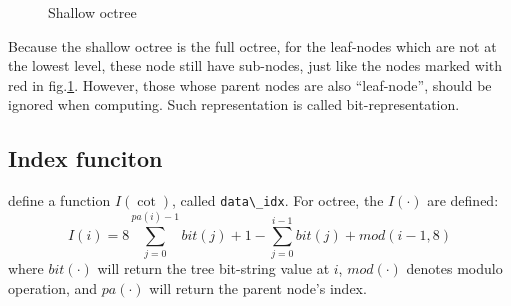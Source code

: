 \documentclass[border=0.5in]{blog}
\begin{document}
    \begin{figure}
        \centering
        \caption{Shallow octree}
        \label{fig:octnet:so}
    \end{figure}
    
    Because the shallow octree is the full octree, for the leaf-nodes which are not at
    the lowest level, these node still have  sub-nodes, just like the nodes marked with red
    in fig.\ref{fig:octnet:so}.
    However, those whose parent nodes are also ``leaf-node'', should be ignored when computing.
    Such representation is called bit-representation.
    
    \subsection{Index funciton}
    \label{sec:octenet:index-func}
    
    \citep{DBLP:journals/corr/RieglerUG16} define a function $I(\cot)$, called \verb|data\_idx|.
    For octree, the $I(\cdot)$ are defined:
    \begin{equation}
        \label{eq:data-index}
        I(i) = 8 \sum\limits_{j=0}^{pa(i)-1}bit(j)+1 - \sum\limits_{j=0}^{i-1}bit(j) + mod(i-1,8)
    \end{equation}
    where $bit(\cdot)$ will return the tree bit-string value at $i$,
    $mod(\cdot)$ denotes modulo operation, and $pa(\cdot)$ will return the parent node's index.
    
\end{document}
